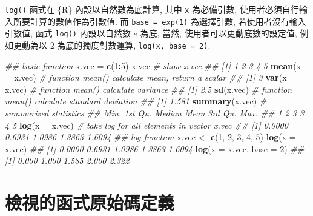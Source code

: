 \documentclass[
]{book}
\newenvironment{Shaded}{\begin{snugshade}}{\end{snugshade}}
\newcommand{\CommentTok}[1]{\textcolor[rgb]{0.56,0.35,0.01}{\textit{#1}}}
\newcommand{\DataTypeTok}[1]{\textcolor[rgb]{0.13,0.29,0.53}{#1}}
\newcommand{\DecValTok}[1]{\textcolor[rgb]{0.00,0.00,0.81}{#1}}
\newcommand{\KeywordTok}[1]{\textcolor[rgb]{0.13,0.29,0.53}{\textbf{#1}}}
\newcommand{\NormalTok}[1]{#1}
\newcommand{\OperatorTok}[1]{\textcolor[rgb]{0.81,0.36,0.00}{\textbf{#1}}}
\newcommand{\StringTok}[1]{\textcolor[rgb]{0.31,0.60,0.02}{#1}}
\begin{document}
\texttt{log()} 函式在 \{R\} 內設以自然數為底計算,
其中 \texttt{x} 為必備引數,
使用者必須自行輸入所要計算的數值作為引數值.
而 \texttt{base\ =\ exp(1)}
為選擇引數,
若使用者沒有輸入引數值,
函式 \texttt{log()} 內設以自然數 \(e\) 為底,
當然, 使用者可以更動底數的設定值,
例如更動為以 \(2\) 為底的獨度對數運算,
\texttt{log(x,\ base\ =\ 2)}.

\begin{Shaded}
\begin{Highlighting}[]
\CommentTok{\#\# basic function}
\NormalTok{x.vec =}\StringTok{ }\KeywordTok{c}\NormalTok{(}\DecValTok{1}\OperatorTok{:}\DecValTok{5}\NormalTok{)}
\NormalTok{x.vec           }\CommentTok{\# show x.vec}
\CommentTok{\#\# [1] 1 2 3 4 5}
\KeywordTok{mean}\NormalTok{(}\DataTypeTok{x =}\NormalTok{ x.vec) }\CommentTok{\# function mean() calculate mean, return a scalar}
\CommentTok{\#\# [1] 3}
\KeywordTok{var}\NormalTok{(}\DataTypeTok{x =}\NormalTok{ x.vec)  }\CommentTok{\# function mean() calculate variance}
\CommentTok{\#\# [1] 2.5}
\KeywordTok{sd}\NormalTok{(x.vec)       }\CommentTok{\# function mean() calculate standard deviation}
\CommentTok{\#\# [1] 1.581}
\KeywordTok{summary}\NormalTok{(x.vec)  }\CommentTok{\# summarized statistics}
\CommentTok{\#\#    Min. 1st Qu.  Median    Mean 3rd Qu.    Max. }
\CommentTok{\#\#       1       2       3       3       4       5}
\KeywordTok{log}\NormalTok{(}\DataTypeTok{x =}\NormalTok{ x.vec)  }\CommentTok{\# take log for all elements in vector x.vec}
\CommentTok{\#\# [1] 0.0000 0.6931 1.0986 1.3863 1.6094}
\CommentTok{\#\# log function}
\NormalTok{x.vec \textless{}{-}}\StringTok{ }\KeywordTok{c}\NormalTok{(}\DecValTok{1}\NormalTok{, }\DecValTok{2}\NormalTok{, }\DecValTok{3}\NormalTok{, }\DecValTok{4}\NormalTok{, }\DecValTok{5}\NormalTok{)}
\KeywordTok{log}\NormalTok{(}\DataTypeTok{x =}\NormalTok{ x.vec)}
\CommentTok{\#\# [1] 0.0000 0.6931 1.0986 1.3863 1.6094}
\KeywordTok{log}\NormalTok{(}\DataTypeTok{x =}\NormalTok{ x.vec, }\DataTypeTok{base =} \DecValTok{2}\NormalTok{)}
\CommentTok{\#\# [1] 0.000 1.000 1.585 2.000 2.322}
\end{Highlighting}
\end{Shaded}

\hypertarget{ux6aa2ux8996ux7684ux51fdux5f0fux539fux59cbux78bcux5b9aux7fa9}{%
\section{檢視的函式原始碼定義}\label{ux6aa2ux8996ux7684ux51fdux5f0fux539fux59cbux78bcux5b9aux7fa9}}
\end{document}
